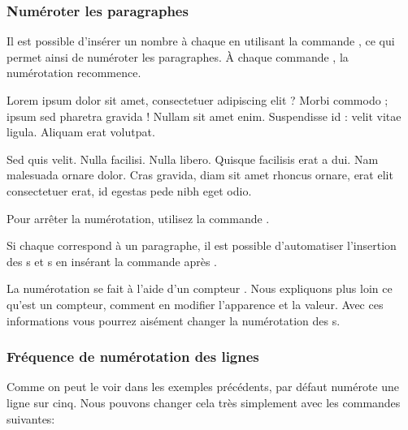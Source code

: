 \subsubsection{Numéroter les paragraphes}

Il est possible d'insérer un nombre à chaque  en utilisant la commande \label{numberpstarttrue}, ce qui permet ainsi de numéroter les paragraphes. À chaque commande , la numérotation recommence.

\begin{minipage}{0.8\textwidth}
\numberpstarttrue
\beginnumbering
\pstart 
Lorem ipsum dolor sit amet, consectetuer adipiscing elit ?
Morbi commodo ; ipsum sed pharetra gravida !
Nullam sit amet enim. Suspendisse id : velit vitae ligula. 
Aliquam erat volutpat. \pend


\pstart Sed quis velit. Nulla facilisi. Nulla libero. 
 Quisque facilisis erat a dui.
Nam malesuada ornare dolor.
Cras gravida, diam sit amet rhoncus ornare, 
erat  elit consectetuer erat, id egestas pede nibh eget odio.
\pend
\endnumbering
\end{minipage}

Pour arrêter la numérotation,  utilisez la commande .

\begin{plusloins}
Si chaque  correspond à un paragraphe, il est possible d'automatiser l'insertion des s et s en insérant la commande  après .
\end{plusloins}

\begin{plusloins}
La numérotation se fait à l'aide d'un compteur . Nous expliquons plus loin ce qu'est un compteur, comment en modifier l'apparence et la valeur. Avec ces informations vous pourrez aisément changer la numérotation des s.
\end{plusloins}

\subsubsection{Fréquence de numérotation des lignes}

Comme on peut le voir dans les exemples précédents, par défaut  numérote  une ligne sur cinq. Nous pouvons changer cela très simplement avec les commandes suivantes:

